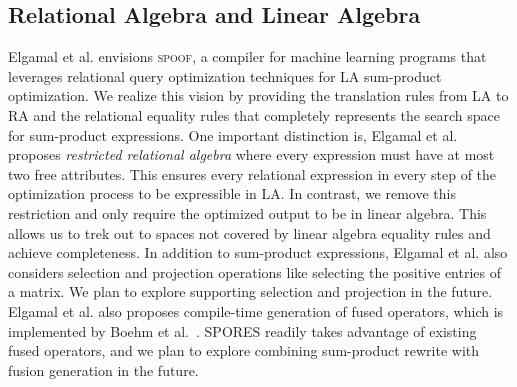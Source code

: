 
\subsection{Relational Algebra and Linear Algebra}
Elgamal et al. \cite{ElgamalLBETRS17} envisions \textsc{spoof}, a compiler for machine learning programs
that leverages relational query optimization techniques for LA sum-product optimization. 
We realize this vision by providing the translation
rules from LA to RA and the relational equality rules that completely represents
the search space for sum-product expressions. One important distinction is, Elgamal
et al. proposes \emph{restricted relational algebra} where every expression must
have at most two free attributes. This ensures every relational expression in every step of the
optimization process to be expressible in LA. In contrast, we remove this restriction and only require the 
optimized output to be in linear algebra. This allows us to trek out to spaces not
covered by linear algebra equality rules and achieve completeness. In addition 
to sum-product expressions, Elgamal et al. also considers selection and projection operations
like selecting the positive entries of a matrix. We plan to explore supporting
selection and projection in the future. Elgamal et al. also proposes compile-time generation of
fused operators, which is implemented by Boehm et al.~\cite{DBLP:journals/pvldb/BoehmRHSEP18}.
SPORES readily takes advantage of existing fused operators, and we
plan to explore combining sum-product rewrite with fusion generation in the future. 


